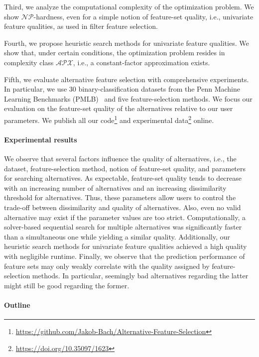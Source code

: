 \documentclass{article}
\theoremstyle{definition}
\begin{document}
Third, we analyze the computational complexity of the optimization problem.
We show $\mathcal{NP}$-hardness, even for a simple notion of feature-set quality, i.e., univariate feature qualities, as used in filter feature selection.

Fourth, we propose heuristic search methods for univariate feature qualities.
We show that, under certain conditions, the optimization problem resides in complexity class $\mathcal{APX}$, i.e., a constant-factor approximation exists.

Fifth, we evaluate alternative feature selection with comprehensive experiments.
In particular, we use 30 binary-classification datasets from the Penn Machine Learning Benchmarks (PMLB)~\cite{olson2017pmlb, romano2021pmlb} and five feature-selection methods.
We focus our evaluation on the feature-set quality of the alternatives relative to our user parameters.
We publish all our code\footnote{\url{https://github.com/Jakob-Bach/Alternative-Feature-Selection}} and experimental data\footnote{\url{https://doi.org/10.35097/1623}} online.

\paragraph{Experimental results}

We observe that several factors influence the quality of alternatives, i.e., the dataset, feature-selection method, notion of feature-set quality, and parameters for searching alternatives.
As expectable, feature-set quality tends to decrease with an increasing number of alternatives and an increasing dissimilarity threshold for alternatives.
Thus, these parameters allow users to control the trade-off between dissimilarity and quality of alternatives.
Also, even no valid alternative may exist if the parameter values are too strict.
Computationally, a solver-based sequential search for multiple alternatives was significantly faster than a simultaneous one while yielding a similar quality.
Additionally, our heuristic search methods for univariate feature qualities achieved a high quality with negligible runtime.
Finally, we observe that the prediction performance of feature sets may only weakly correlate with the quality assigned by feature-selection methods.
In particular, seemingly bad alternatives regarding the latter might still be good regarding the former.

\paragraph{Outline}
\end{document}
